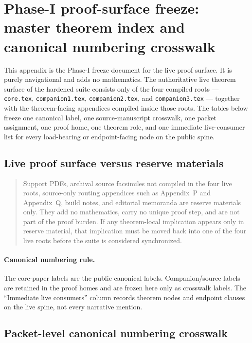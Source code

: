 \section{Phase-I proof-surface freeze: master theorem index and canonical numbering crosswalk}\label{app:phase1-freeze}

This appendix is the Phase-I freeze document for the live proof surface. It is purely navigational and adds no mathematics. The authoritative live theorem surface of the hardened suite consists only of the four compiled roots --- \texttt{core.tex}, \texttt{companion1.tex}, \texttt{companion2.tex}, and \texttt{companion3.tex} --- together with the theorem-facing appendices compiled inside those roots. The tables below freeze one canonical label, one source-manuscript crosswalk, one packet assignment, one proof home, one theorem role, and one immediate live-consumer list for every load-bearing or endpoint-facing node on the public spine.

\subsection*{Live proof surface versus reserve materials}

\begin{quote}\small
Support PDFs, archival source facsimiles not compiled in the four live roots, source-only routing appendices such as Appendix~P and Appendix~Q, build notes, and editorial memoranda are reserve materials only. They add no mathematics, carry no unique proof step, and are not part of the proof burden. If any theorem-local implication appears only in reserve material, that implication must be moved back into one of the four live roots before the suite is considered synchronized.
\end{quote}

\paragraph{Canonical numbering rule.}
The core-paper labels are the public canonical labels. Companion/source labels are retained in the proof homes and are frozen here only as crosswalk labels. The ``Immediate live consumers'' column records theorem nodes and endpoint clauses on the live spine, not every narrative mention.

\subsection*{Packet-level canonical numbering crosswalk}

